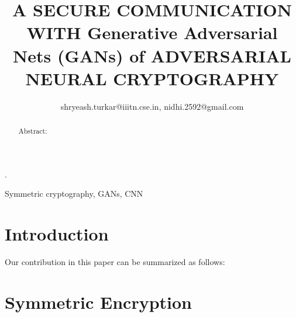 \documentclass[journal,transmag]{IEEEtran}
\begin{document}
	
	\title{A SECURE COMMUNICATION WITH Generative Adversarial Nets (GANs) of ADVERSARIAL NEURAL CRYPTOGRAPHY}
	
	
	\author{
	
		
		shryeash.turkar@iiitn.cse.in, nidhi.2592@gmail.com
		
	}
	
	
	


	

	\maketitle.

	\begin{abstract}
		Abstract: 
	\end{abstract}
    
    \begin{IEEEkeywords}
    	Symmetric cryptography, GANs, CNN
    \end{IEEEkeywords}
    
    
    
	\section{Introduction}
	
    \par
     Our contribution in this paper can be summarized as follows:


	 \section{Symmetric Encryption}
	     
    
    
    
    
    
    
    
    
\end{document}
